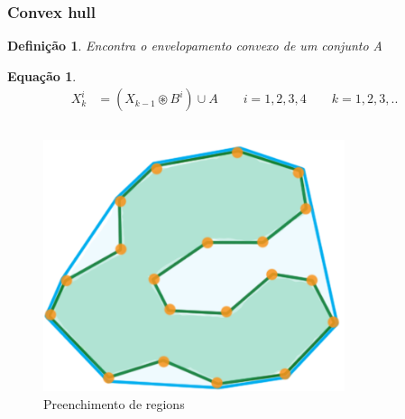 \documentclass[aspectratio=169]{beamer}
\theoremstyle{Definition}
\newtheorem{defn}{Defini\c c\~ao}
\newtheorem{eq}[theorem]{Equa\c c\~ao}
\begin{document}
\begin{frame}
	\frametitle{Convex hull}
	
	\begin{defn}
		Encontra o envelopamento convexo de um conjunto A
	\end{defn}
	
	\begin{eq}
	
		\begin{align*}
			X^i_k& = ( X_{k-1} \circledast B^i) \cup A \qquad i = 1, 2, 3, 4 \qquad k = 1, 2, 3,..
		\end{align*}

	\end{eq}
	
	\begin{columns}
		\begin{column}{0.5\textwidth}
			\begin{figure}[h]
	  		 	\includegraphics[height=0.15\paperheight]{imagens/convex_hull}
				\caption{Preenchimento de regions}\label{figLogical}
			\end{figure}
		\end{column}
		\begin{column}{0.5\textwidth}
			\begin{figure}[h]

\end{figure}
\end{column}
\end{columns}
\end{frame}
\end{document}
